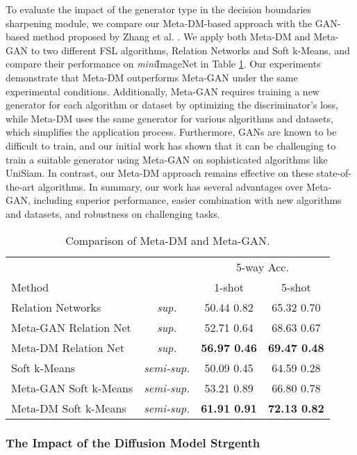\documentclass{article}
\begin{document}
To evaluate the impact of the generator type in the decision boundaries sharpening module, we compare our Meta-DM-based approach with the GAN-based method proposed by Zhang et al. \cite{i3}. We apply both Meta-DM and Meta-GAN to two different FSL algorithms, Relation Networks and Soft k-Means, and compare their performance on \textit{mini}ImageNet in Table \ref{table7}. Our experiments demonstrate that Meta-DM outperforms Meta-GAN under the same experimental conditions. Additionally, Meta-GAN requires training a new generator for each algorithm or dataset by optimizing the discriminator's loss, while Meta-DM uses the same generator for various algorithms and datasets, which simplifies the application process. Furthermore, GANs are known to be difficult to train, and our initial work has shown that it can be challenging to train a suitable generator using Meta-GAN on sophisticated algorithms like UniSiam. In contrast, our Meta-DM approach remains effective on these state-of-the-art algorithms. In summary, our work has several advantages over Meta-GAN, including superior performance, easier combination with new algorithms and datasets, and robustness on challenging tasks. 


\begin{table}
	\caption{Comparison of Meta-DM and Meta-GAN. }
	\centering
	\begin{tabular}{lccc}
		\toprule
		& & \multicolumn{2}{c}{5-way Acc.} \\
		Method &    & 1-shot     & 5-shot  \\
		\midrule
		Relation Networks \cite{i4} & \textit{sup.}  & 50.44  0.82   & 65.32  0.70    \\
		Meta-GAN  Relation Net \cite{i3} & \textit{sup.}  & 52.71  0.64   & 68.63  0.67    \\
		Meta-DM  Relation Net  & \textit{sup.}  & \textbf{56.97  0.46}  & \textbf{69.47  0.48}     \\
		\midrule
		Soft k-Means \cite{i6} & \textit{semi-sup.} & 50.09  0.45   & 64.59  0.28    \\
		Meta-GAN  Soft k-Means \cite{i3} & \textit{semi-sup.} & 53.21  0.89   & 66.80  0.78    \\
		Meta-DM  Soft k-Means & \textit{semi-sup.} & \textbf{61.91  0.91}   & \textbf{72.13  0.82}   \\
		\bottomrule
	\end{tabular}
	\label{table7}
\end{table}


\subsubsection{The Impact of the Diffusion Model Strgenth}
\end{document}

